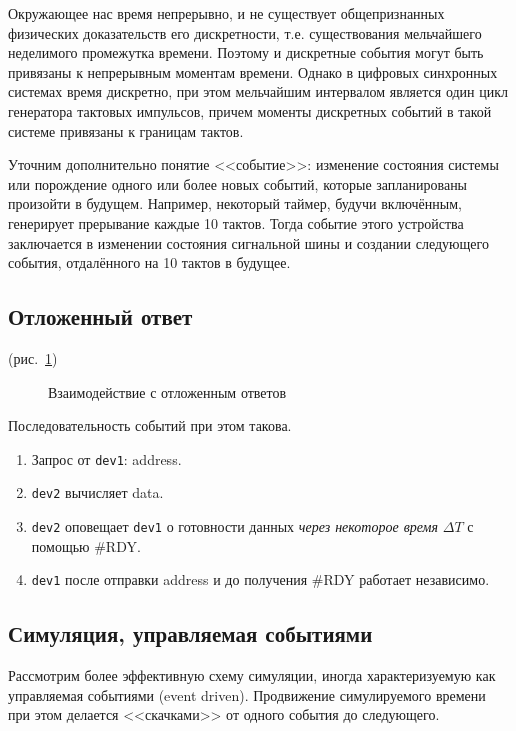 Окружающее нас время непрерывно, и не существует общепризнанных физических доказательств его дискретности, т.е. существования мельчайшего неделимого промежутка времени. Поэтому и дискретные события могут быть привязаны к непрерывным моментам времени. Однако в цифровых синхронных системах время дискретно, при этом мельчайшим интервалом является один цикл генератора тактовых импульсов, причем моменты дискретных событий в такой системе привязаны к границам тактов.

Уточним дополнительно понятие <<событие>>: изменение состояния системы или порождение одного или более новых событий, которые запланированы произойти в будущем. Например, некоторый таймер, будучи включённым, генерирует прерывание каждые 10 тактов. Тогда событие этого устройства заключается в изменении состояния сигнальной шины и создании следующего события, отдалённого на 10 тактов в будущее.

\subsection{Отложенный ответ}


(рис.~\ref{fig:delayed-response})

\begin{figure}[htp]
    \centering
    \caption[Взаимодействие с отложенным ответов]{Взаимодействие с отложенным ответов}
    \label{fig:delayed-response}
\end{figure}

Последовательность событий при этом такова.
\begin{enumerate}
    \item Запрос от \texttt{dev1}: address.
    \item \texttt{dev2} вычисляет data.
    \item \texttt{dev2} оповещает \texttt{dev1} о готовности данных \textit{через некоторое время} $\Delta T$ с помощью \#RDY.
    \item \texttt{dev1} после отправки address и до получения \#RDY работает независимо.
\end{enumerate}



\subsection{Симуляция, управляемая событиями}

Рассмотрим более эффективную схему симуляции, иногда характеризуемую как управляемая событиями (\abbr event driven). Продвижение симулируемого времени при этом делается <<скачками>> от одного события до следующего.

